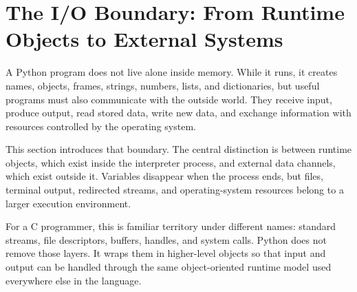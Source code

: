 \section{The I/O Boundary: From Runtime Objects to External Systems}

A Python program does not live alone inside memory. While it runs, it creates names, objects, frames, strings, numbers, lists, and dictionaries, but useful programs must also communicate with the outside world. They receive input, produce output, read stored data, write new data, and exchange information with resources controlled by the operating system.

This section introduces that boundary. The central distinction is between runtime objects, which exist inside the interpreter process, and external data channels, which exist outside it. Variables disappear when the process ends, but files, terminal output, redirected streams, and operating-system resources belong to a larger execution environment.

For a C programmer, this is familiar territory under different names: standard streams, file descriptors, buffers, handles, and system calls. Python does not remove those layers. It wraps them in higher-level objects so that input and output can be handled through the same object-oriented runtime model used everywhere else in the language.